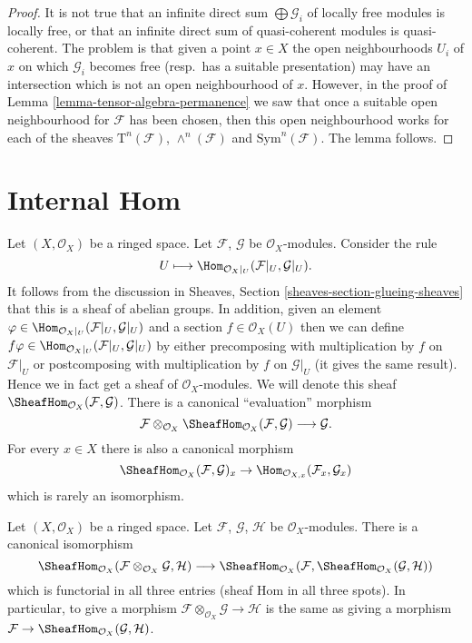 \begin{proof}
It is not true that an infinite direct sum $\bigoplus \mathcal{G}_i$ of
locally free modules is locally free, or that an
infinite direct sum of quasi-coherent modules
is quasi-coherent. The problem is that given a
point $x \in X$ the open neighbourhoods $U_i$ of $x$ on which $\mathcal{G}_i$
becomes free (resp.\ has a suitable presentation) may have an intersection
which is not an open neighbourhood of $x$. However, in the
proof of Lemma \ref{lemma-tensor-algebra-permanence} we saw that
once a suitable open neighbourhood for $\mathcal{F}$ has been chosen,
then this open neighbourhood works for each of the sheaves
$\text{T}^n(\mathcal{F})$, $\wedge^n(\mathcal{F})$ and
$\text{Sym}^n(\mathcal{F})$.
The lemma follows.
\end{proof}







\section{Internal Hom}
\label{section-internal-hom}

\noindent
Let $(X, \mathcal{O}_X)$ be a ringed space.
Let $\mathcal{F}$, $\mathcal{G}$ be $\mathcal{O}_X$-modules.
Consider the rule
$$
U \longmapsto \Hom_{\mathcal{O}_X|_U}(\mathcal{F}|_U, \mathcal{G}|_U).
$$
It follows from the discussion in Sheaves, Section
\ref{sheaves-section-glueing-sheaves} that this is a sheaf of
abelian groups. In addition, given an element
$\varphi \in \Hom_{\mathcal{O}_X|_U}(\mathcal{F}|_U, \mathcal{G}|_U)$
and a section $f \in \mathcal{O}_X(U)$ then we can define
$f\varphi \in \Hom_{\mathcal{O}_X|_U}(\mathcal{F}|_U, \mathcal{G}|_U)$
by either precomposing with multiplication by $f$ on $\mathcal{F}|_U$
or postcomposing with multiplication by $f$ on $\mathcal{G}|_U$ (it gives
the same result). Hence we in fact get a sheaf of $\mathcal{O}_X$-modules.
We will denote this sheaf
$\SheafHom_{\mathcal{O}_X}(\mathcal{F}, \mathcal{G})$.
There is a canonical ``evaluation'' morphism
$$
\mathcal{F}
\otimes_{\mathcal{O}_X}
\SheafHom_{\mathcal{O}_X}(\mathcal{F}, \mathcal{G})
\longrightarrow
\mathcal{G}.
$$
For every $x \in X$ there is also a canonical morphism
$$
\SheafHom_{\mathcal{O}_X}(\mathcal{F}, \mathcal{G})_x
\to
\Hom_{\mathcal{O}_{X, x}}(\mathcal{F}_x, \mathcal{G}_x)
$$
which is rarely an isomorphism.

\begin{lemma}
\label{lemma-internal-hom}
Let $(X, \mathcal{O}_X)$ be a ringed space.
Let $\mathcal{F}$, $\mathcal{G}$, $\mathcal{H}$ be $\mathcal{O}_X$-modules.
There is a canonical isomorphism
$$
\SheafHom_{\mathcal{O}_X}
(\mathcal{F} \otimes_{\mathcal{O}_X} \mathcal{G}, \mathcal{H})
\longrightarrow
\SheafHom_{\mathcal{O}_X}
(\mathcal{F}, \SheafHom_{\mathcal{O}_X}(\mathcal{G}, \mathcal{H}))
$$
which is functorial in all three entries (sheaf Hom in
all three spots). In particular, to give a
morphism $\mathcal{F} \otimes_{\mathcal{O}_X} \mathcal{G} \to \mathcal{H}$
is the same as giving a morphism
$\mathcal{F} \to \SheafHom_{\mathcal{O}_X}(\mathcal{G}, \mathcal{H})$.
\end{lemma}

